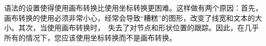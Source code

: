 
语法的设置使得使用画布转换比使用坐标转换更困难。这样做有两个原因：首先，画布转换的使用必须非常小心，经常会导致``糟糕''的图形，改变了线宽和文本的大小。其次，当使用画布转换时，\pgfname\ 失去了对节点和形状位置的跟踪。因此，在几乎所有的情况下，您应该使用坐标转换而不是画布转换。

\clearpage